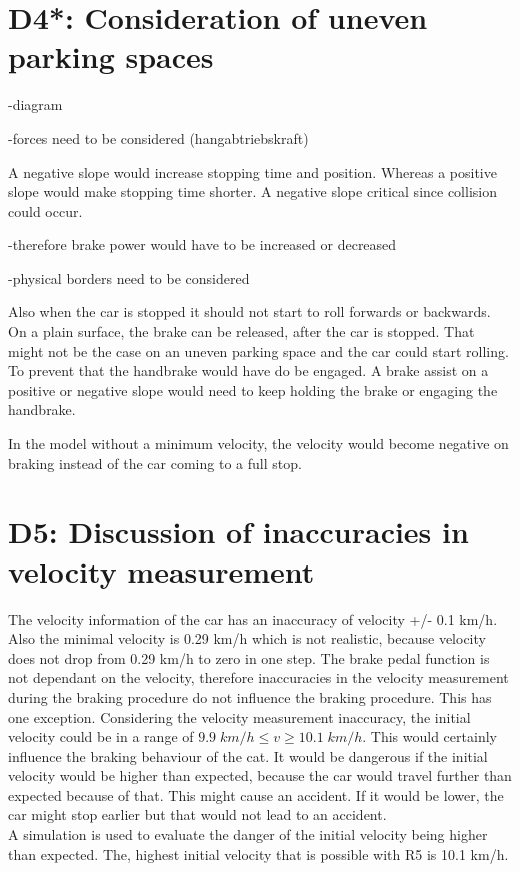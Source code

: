 \chapter{D4*: Consideration of uneven parking spaces}\label{cha:D4}

-diagram

-forces need to be considered (hangabtriebskraft)

A negative slope would increase stopping time and position. Whereas a positive slope would make stopping time shorter.
A negative slope critical since collision could occur.


-therefore brake power would have to be increased or decreased

-physical borders need to be considered

Also when the car is stopped it should not start to roll forwards or backwards.
On a plain surface, the brake can be released, after the car is stopped. That might not be the case on an uneven parking space and the car could start rolling. To prevent that the handbrake would have do be engaged.
A brake assist on a positive or negative slope would need to keep holding the brake or engaging the handbrake.

In the model without a minimum velocity, the velocity would become negative on braking instead of the car coming to a full stop.

\chapter{D5: Discussion of inaccuracies in velocity measurement}\label{cha:D5}



The velocity information of the car has an inaccuracy of velocity +/- 0.1 km/h. Also the minimal velocity is 0.29 km/h which is not realistic, because velocity does not drop from 0.29 km/h to zero in one step. The brake pedal function is not dependant on the velocity, therefore inaccuracies in the velocity measurement during the braking procedure do not influence the braking procedure. This has one exception.
Considering the velocity measurement inaccuracy, the initial velocity could be in a range of $9.9\; km/h \leq v  \geq 10.1\; km/h$. This would certainly influence the braking behaviour of the cat. It would be dangerous if the initial velocity would be higher than expected, because the car would travel further than expected because of that. This might cause an accident. If it would be lower, the car might stop earlier but that would not lead to an accident.\\
A simulation is used to evaluate the danger of the initial velocity being higher than expected. The, highest initial velocity that is possible with R5 is 10.1 km/h.








